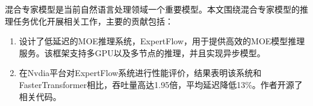 
\begin{comments}

混合专家模型是当前自然语言处理领域一个重要模型。本文围绕混合专家模型的推理任务优化开展相关工作，主要的贡献包括：
  \begin{enumerate}
      \item 设计了低延迟的MOE推理系统，ExpertFlow，用于提供高效的MOE模型推理服务。该框架支持多GPU以及多节点的推理，并且实现异步模型。
      \item 在Nvdia平台对ExpertFlow系统进行性能评价，结果表明该系统和FasterTransformer相比，吞吐量高达1.95倍，平均延迟降低13\%。作者开源了相关代码。
  \end{enumerate}

\end{comments}
